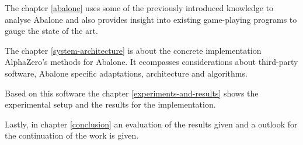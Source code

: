 The chapter \ref{abalone} uses some of the previously introduced knowledge to analyse Abalone and also provides insight into existing game-playing programs to gauge the state of the art.

The chapter \ref{system-architecture} is about the concrete implementation AlphaZero's methods for Abalone. It ecompasses considerations about third-party software, Abalone specific adaptations, architecture and algorithms.

Based on this software the chapter \ref{experiments-and-results} shows the experimental setup and the results for the implementation.

Lastly, in chapter \ref{conclusion} an evaluation of the results given and a outlook for the continuation of the work is given.
